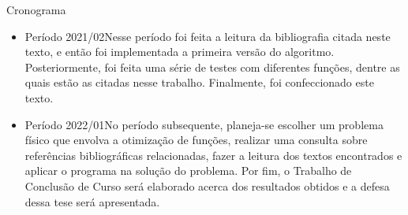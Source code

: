 \begin{frame}{Cronograma}
  \begin{itemize}
    \item Período 2021/02\trav Nesse período foi feita a leitura da bibliografia citada neste
          texto, e então foi implementada a primeira versão do algoritmo.
          Posteriormente, foi feita uma série de testes com diferentes funções, dentre as quais
          estão as citadas nesse trabalho. Finalmente, foi confeccionado este texto.
    \item Período 2022/01\trav No período subsequente, planeja-se escolher um problema físico
          que envolva a otimização de funções, realizar uma consulta sobre referências bibliográficas
          relacionadas, fazer a leitura dos textos encontrados e aplicar o programa na solução
          do problema. Por fim, o Trabalho de Conclusão de Curso será elaborado acerca dos
          resultados obtidos e a defesa dessa tese será apresentada.
  \end{itemize}
\end{frame}

\nocite{holland1992ga}


